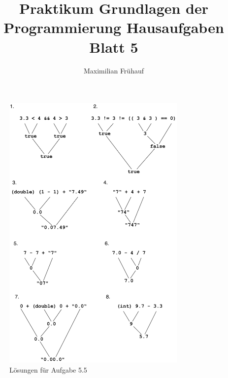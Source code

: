 \documentclass[a4paper, 10pt]{article}
\title{Praktikum Grundlagen der Programmierung Hausaufgaben Blatt 5}
\author{Maximilian Frühauf}
\begin{document}
\maketitle
\begin{figure}[htpb]
	\centering
	\includegraphics[width=9cm, height=\textheight, keepaspectratio]{Blatt5Solutions}
	\caption{Lösungen für Aufgabe 5.5}
\end{figure}
\end{document}
